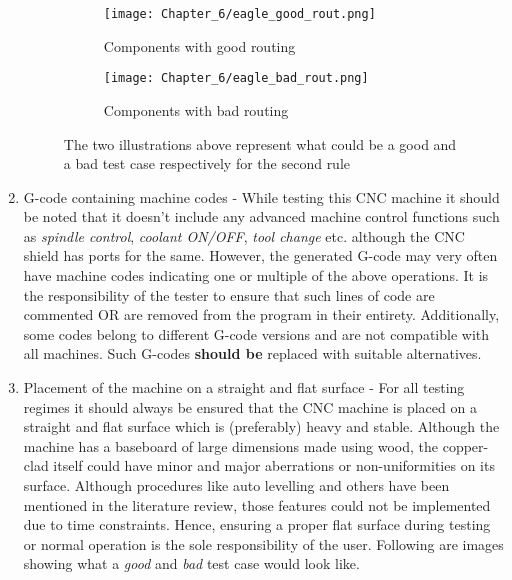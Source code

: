 \begin{enumerate}
    \begin{figure}[h]

    \begin{subfigure}{0.5\textwidth}
    \hspace{8mm}
        \texttt{[image: Chapter\_6/eagle\_good\_rout.png]}
        \caption{Components with good routing}
        \label{fig:grout}
    \end{subfigure}
    \begin{subfigure}{0.5\textwidth}
    \hspace{8mm}
        \texttt{[image: Chapter\_6/eagle\_bad\_rout.png]}
        \caption{Components with bad routing}
        \label{fig:brout}
    \end{subfigure}

    \caption{The two illustrations above represent what could be a good and a bad test case respectively for the second rule}
    \label{fig:gbrout}
    \end{figure}
    
    \item G-code containing machine codes - While testing this CNC machine it should be noted that it doesn’t include any advanced machine control functions such as \textit{spindle control}, \textit{coolant ON/OFF}, \textit{tool change} etc. although the CNC shield has ports for the same. However, the generated G-code may very often have machine codes indicating one or multiple of the above operations. It is the responsibility of the tester to ensure that such lines of code are commented OR are removed from the program in their entirety. Additionally, some codes belong to different G-code versions and are not compatible with all machines. Such G-codes \textbf{should be} replaced with suitable alternatives.
    
    \item Placement of the machine on a straight and flat surface - For all testing regimes it should always be ensured that the CNC machine is placed on a straight and flat surface which is (preferably) heavy and stable. Although the machine has a baseboard of large dimensions made using wood, the copper-clad itself could have minor and major aberrations or non-uniformities on its surface. Although procedures like auto levelling and others have been mentioned in the literature review, those features could not be implemented due to time constraints. Hence, ensuring a proper flat surface during testing or normal operation is the sole responsibility of the user. Following are images showing what a \textit{good} and \textit{bad} test case would look like.


\end{enumerate}
